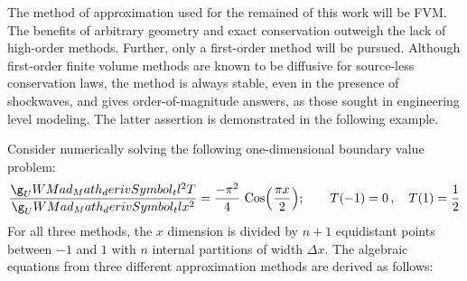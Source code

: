 \documentclass[12pt]{../UWMadThesis}
\begin{document}
The method of approximation used for the remained of this work will be FVM.
The benefits of arbitrary geometry and exact conservation outweigh the lack of high-order methods.
Further, only a first-order method will be pursued.
Although first-order finite volume methods are known to be diffusive for source-less conservation laws, the method is always stable, even in the presence of shockwaves, and gives order-of-magnitude answers, as those sought in engineering level modeling.
The latter assertion is demonstrated in the following example.

Consider numerically solving the following one-dimensional boundary value problem:
\begin{equation}
    \deriv{T}{x}{2} = \frac{-\pi^2}{4}\,\Cos\left(\frac{\pi x}{2}\right);\quad\quad T(-1) = 0\,,\quad T(1) = \frac{1}{2}
    \label{Eqn:NM_Example_BVP}
\end{equation}
For all three methods, the $x$ dimension is divided by $n+1$ equidistant points between $-1$ and $1$ with $n$ internal partitions of width $\Delta{x}$.
The algebraic equations from three different approximation methods are derived as follows:
\end{document}
